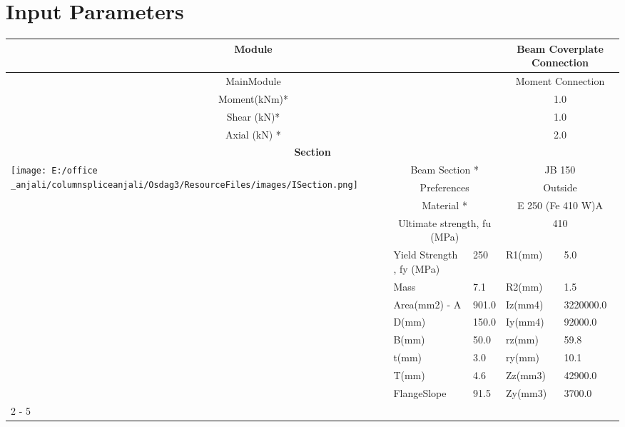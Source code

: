 \documentclass{article}%
\begin{document}
%
\normalsize%
\pagestyle{header}%
\section{Input Parameters}%
\label{sec:InputParameters}%
\renewcommand{\arraystretch}{1.2}%
\begin{longtable}{|p{5cm}|p{2cm}|p{2cm}|p{2cm}|p{5cm}|}%
\hline%
\hline%
\multicolumn{3}{|c|}{Module}&\multicolumn{2}{|c|}{Beam Coverplate Connection}\\%
\hline%
\hline%
\multicolumn{3}{|c|}{MainModule}&\multicolumn{2}{|c|}{Moment Connection}\\%
\hline%
\hline%
\multicolumn{3}{|c|}{Moment(kNm)*}&\multicolumn{2}{|c|}{1.0}\\%
\hline%
\hline%
\multicolumn{3}{|c|}{Shear (kN)*}&\multicolumn{2}{|c|}{1.0}\\%
\hline%
\hline%
\multicolumn{3}{|c|}{Axial (kN) *}&\multicolumn{2}{|c|}{2.0}\\%
\hline%
\hline%
\multicolumn{5}{|c|}{\textbf{Section}}\\%
\hline%
\hline%
\multirow{12}{*}{\texttt{[image: E:/office \_anjali/columnspliceanjali/Osdag3/ResourceFiles/images/ISection.png]}}&\multicolumn{2}{|c|}{Beam Section *}&\multicolumn{2}{|c|}{JB 150}\\%
\cline{2%
-%
5}%
&\multicolumn{2}{|c|}{Preferences}&\multicolumn{2}{|c|}{Outside}\\%
\cline{2%
-%
5}%
&\multicolumn{2}{|c|}{Material *}&\multicolumn{2}{|c|}{E 250 (Fe 410 W)A}\\%
\cline{2%
-%
5}%
&\multicolumn{2}{|c|}{Ultimate strength, fu (MPa)}&\multicolumn{2}{|c|}{410}\\%
\cline{2%
-%
5}%
&Yield Strength , fy (MPa)&250&R1(mm)&5.0\\%
\cline{2%
-%
5}%
&Mass&7.1&R2(mm)&1.5\\%
\cline{2%
-%
5}%
&Area(mm2) {-} A&901.0&Iz(mm4)&3220000.0\\%
\cline{2%
-%
5}%
&D(mm)&150.0&Iy(mm4)&92000.0\\%
\cline{2%
-%
5}%
&B(mm)&50.0&rz(mm)&59.8\\%
\cline{2%
-%
5}%
&t(mm)&3.0&ry(mm)&10.1\\%
\cline{2%
-%
5}%
&T(mm)&4.6&Zz(mm3)&42900.0\\%
\cline{2%
-%
5}%
&FlangeSlope&91.5&Zy(mm3)&3700.0\\%
\cline{2%
-%
5}%
\hline%
\multicolumn{5}{|c|}{\textbf{Bolt Details}}\\%
\hline%

\end{longtable}
\end{document}
